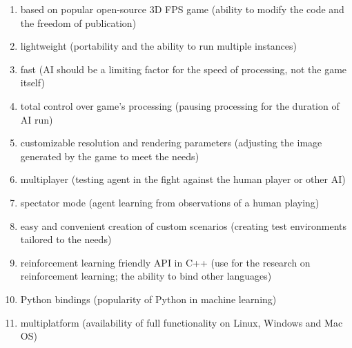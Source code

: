 \begin{enumerate}
\item based on popular open-source 3D FPS game (ability to modify the code and the freedom of publication)
\item lightweight (portability and the ability to run multiple instances)
\item fast (AI should be a limiting factor for the speed of processing, not the game itself)
\item total control over game's processing (pausing processing for the duration of AI run)
\item customizable resolution and rendering parameters (adjusting the image generated by the game to meet the needs)
\item multiplayer (testing agent in the fight against the human player or other AI)
\item spectator mode (agent learning from observations of a human playing)
\item easy and convenient creation of custom scenarios (creating test environments tailored to the needs)
\item reinforcement learning friendly API in C++ (use for the research on reinforcement learning; the ability to bind other languages)
\item Python bindings (popularity of Python in machine learning)
\item multiplatform (availability of full functionality on Linux, Windows and Mac OS)
\end{enumerate}



	
